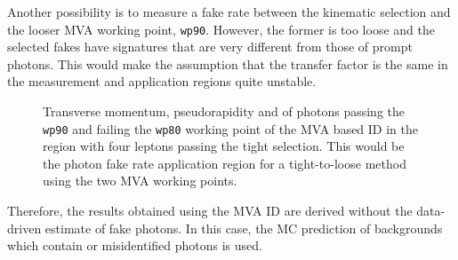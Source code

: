 Another possibility is to measure a fake rate between the kinematic selection and the looser MVA working point, \texttt{wp90}.
However, the former is too loose and the selected fakes have signatures that are very different from those of prompt photons.
This would make the assumption that the transfer factor is the same in the measurement and application regions quite unstable.

\begin{figure}
  \centering
  \caption{Transverse momentum, pseudorapidity and \sieie of photons
    passing the \texttt{wp90} and failing the \texttt{wp80} working point of the MVA based ID
    in the region with four leptons passing the tight selection.
    This would be the photon fake rate application region
    for a tight-to-loose method using the two MVA working points.
    }
  \label{fig:SR4P_lead_90not80}
\end{figure}

Therefore, the results obtained using the MVA ID are derived without the data-driven estimate of fake photons.
In this case, the MC prediction of backgrounds which contain \nonprompt or misidentified photons is used.

